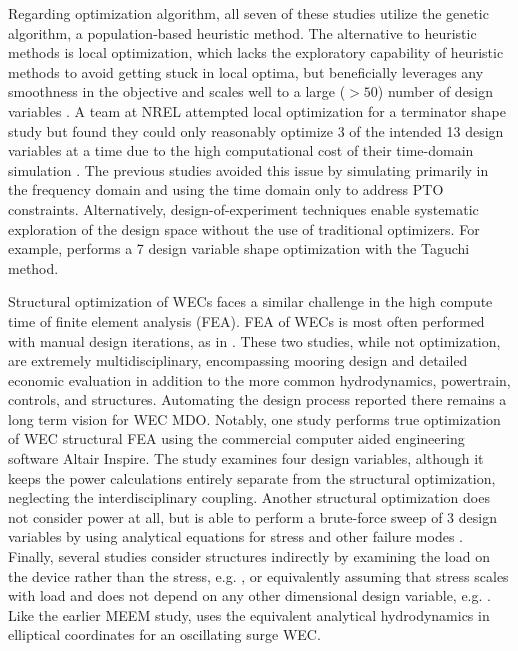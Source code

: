 Regarding optimization algorithm, all seven of these studies \cite{khanal_multi-objective_2024,gaudin_single_2021,edwards_optimisation_2022,garcia-teruel_reliability-based_2021,garcia-teruel_design_2022,cotten_multi-objective_2022,abdulkadir_control_2024} utilize the genetic algorithm, a population-based heuristic method.
The alternative to heuristic methods is local optimization, which lacks the exploratory capability of heuristic methods to avoid getting stuck in local optima, but beneficially leverages any smoothness in the objective and scales well to a large ($>50$) number of design variables \cite{martins_engineering_2022}.
A team at NREL attempted local optimization for a terminator shape study but found they could only reasonably optimize 3 of the intended 13 design variables at a time due to the high computational cost of their time-domain simulation \cite{housner_numerical_2024}.
The previous studies \cite{garcia-teruel_reliability-based_2021,garcia-teruel_design_2022,cotten_multi-objective_2022} avoided this issue by simulating primarily in the frequency domain and using the time domain only to address PTO constraints.
Alternatively, design-of-experiment techniques enable systematic exploration of the design space without the use of traditional optimizers.
For example, \cite{al_shami_parameter_2019} performs a 7 design variable shape optimization with the Taguchi method.

Structural optimization of WECs faces a similar challenge in the high compute time of finite element analysis (FEA).
FEA of WECs is most often performed with manual design iterations, as in \cite{RM3,mi_multi-scale_2025}.
These two studies, while not optimization, are extremely multidisciplinary, encompassing mooring design and detailed economic evaluation in addition to the more common hydrodynamics, powertrain, controls, and structures.
Automating the design process reported there remains a long term vision for WEC MDO.
Notably, one study \cite{an_optimal_2024} performs true optimization of WEC structural FEA using the commercial computer aided engineering software Altair Inspire.
The study examines four design variables, although it keeps the power calculations entirely separate from the structural optimization, neglecting the interdisciplinary coupling.
Another structural optimization does not consider power at all, but is able to perform a brute-force sweep of 3 design variables by using analytical equations for stress and other failure modes \cite{ambuhl_reliability-based_2014}.
Finally, several studies consider structures indirectly by examining the load on the device rather than the stress, e.g. \cite{nguyen_theoretical_2024, ferri_balancing_2014}, or equivalently assuming that stress scales with load and does not depend on any other dimensional design variable, e.g. \cite{garcia-teruel_reliability-based_2021, cotten_multi-objective_2022}.
Like the earlier MEEM study, \cite{nguyen_theoretical_2024} uses the equivalent analytical hydrodynamics in elliptical coordinates for an oscillating surge WEC.

